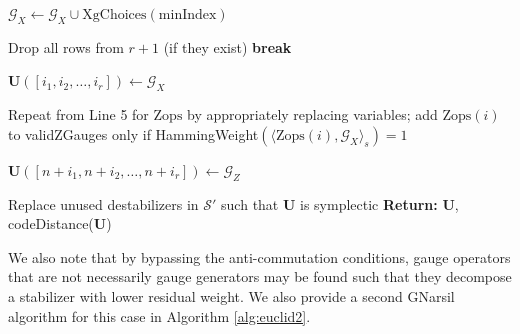 \documentclass[conference]{IEEEtran}
\begin{document}
\begin{algorithm}
\begin{algorithmic}[1]
\State $\mathcal{G}_{X} \gets \mathcal{G}_X \cup \mathrm{XgChoices(minIndex)}$


     \State Drop all rows from $r+1$ (if they exist)
     \State \textbf{break}
  \EndIf

    
\EndFor

\State $\boldsymbol{U}([i_1, i_2, \ldots, i_r]) \gets \mathcal{G}_X$

\State Repeat from Line 5 for $\mathrm{Zops}$ by appropriately replacing variables; add $\mathrm{Zops}(i)$ to validZGauges only if HammingWeight$\left( \langle \mathrm{Zops}(i),\mathcal{G}_{X} \rangle_{s} \right) = 1$


\State $\boldsymbol{U}([n+i_1, n+i_2, \ldots, n+i_r]) \gets \mathcal{G}_Z$

\State Replace unused destabilizers in $\mathcal{S'}$ such that $\boldsymbol{U}$ is symplectic
\State \textbf{Return:} $\boldsymbol{U}$, codeDistance($\boldsymbol{U}$)

\end{algorithmic}
\end{algorithm}


We also note that by bypassing the anti-commutation conditions, gauge operators that are not necessarily gauge generators may be found such that they decompose a stabilizer with lower residual weight. 
We also provide a second GNarsil algorithm for this case in Algorithm \ref{alg:euclid2}.
\end{document}
